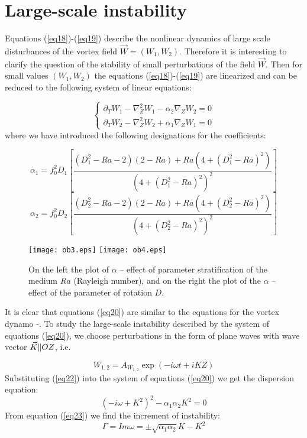 \documentclass [12pt]{article}
\begin{document}
\section{Large-scale instability}

Equations (\ref{eq18})-(\ref{eq19}) describe the nonlinear dynamics of large scale disturbances of the vortex field $\vec{W}=\left(W_{1} ,W_{2} \right)$. Therefore it is interesting to clarify the question of the stability of small perturbations of the field  $\vec{W}$. Then for small values $\left(W_{1} ,W_{2} \right)$  the equations (\ref{eq18})-(\ref{eq19}) are linearized and can be reduced to the following system of linear equations:

\begin{equation} \label{eq20}
 \left\{\begin{array}{c} {\partial _{T} W_{1}
-\nabla _{Z}^{2} W_{1} -\alpha _{2} \nabla _{Z} W_{2} =0} \\ {\partial _{T} W_{2}
-\nabla _{Z}^{2} W_{2} +\alpha _{1} \nabla _{Z} W_{1} =0} \end{array}\right.
\end{equation}
where we have introduced the following designations  for the coefficients:

 \[\alpha _1  = f_0^2 D_1 \left[ {\frac{{(D_1^2  - Ra - 2)(2 - Ra) + Ra(4 + (D_1^2  - Ra)^2 )}}{{(4 + (D_1^2  - Ra)^2 )^2 }}} \right] \]
\begin{equation} \label{eq21}\end{equation}
\[\alpha _2  = f_0^2 D_2 \left[ {\frac{{(D_2^2  - Ra - 2)(2 - Ra) + Ra(4 + (D_2^2  - Ra)^2 )}}{{(4 + (D_2^2  - Ra)^2 )^2 }}} \right] \]

\begin{figure}
  \centering
  \texttt{[image: ob3.eps]}
  \texttt{[image: ob4.eps]}\\
  \caption{On the left the plot of $\alpha $ -- effect of parameter stratification of the medium $Ra$ (Rayleigh number), and on the right the plot of the $\alpha $ -- effect of the parameter of rotation  $D$.} \label{fg3}
\end{figure}


It is clear that equations (\ref{eq20}) are similar to the equations for the vortex dynamo \cite{9s}-\cite{15s}. To study the large-scale instability described by the system of equations (\ref{eq20}), we choose perturbations in the form of plane waves with wave vector $\vec{K}{\rm \parallel }OZ$, i.e.

\begin{equation} \label{eq22}
W_{1,2}  = A_{W_{1,2}}\exp ( -i\omega t + iKZ)
\end{equation}
Substituting (\ref{eq22}) into the system of equations (\ref{eq20}) we get the dispersion equation:
\begin{equation} \label{eq23}
 \left(-i\omega +K^{2} \right)^{2} -\alpha _{1} \alpha _{2} K^{2} =0
\end{equation}
From equation (\ref{eq23}) we find the increment of instability:
\begin{equation} \label{eq24}
 \Gamma =Im \omega  =\pm \sqrt{ \alpha_{1} \alpha_{2} } K-K^{2}
\end{equation}
\end{document}
